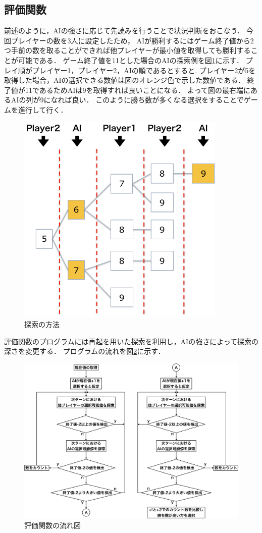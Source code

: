 \documentclass[a4paper,10pt]{jsarticle}
\begin{document}
\subsection{評価関数}
前述のように，AIの強さに応じて先読みを行うことで状況判断をおこなう．
今回プレイヤーの数を3人に設定したため，
AIが勝利するにはゲーム終了値から2つ手前の数を取ることができれば他プレイヤーが最小値を取得しても勝利することが可能である．
ゲーム終了値を11とした場合のAIの探索例を図\ref{fig:search}に示す．
プレイ順がプレイヤー1，プレイヤー2，AIの順であるとすると.
プレイヤー2が5を取得した場合，AIの選択できる数値は図のオレンジ色で示した数値である．
終了値が11であるためAIは9を取得すれば良いことになる．
よって図の最右端にあるAIの列が9になれば良い．
このように勝ち数が多くなる選択をすることでゲームを進行して行く．
\begin{figure}
  \centering
  \includegraphics[width=100mm]{./image/AI_Search.png}
  \caption{探索の方法}
  \label{fig:search}
\end{figure}
\par
評価関数のプログラムには再起を用いた探索を利用し，AIの強さによって探索の深さを変更する．
プログラムの流れを図\ref{fig:Flow}に示す．
\begin{figure}
  \centering
  \includegraphics[width=140mm]{./image/Search_Flow.png}
  \caption{評価関数の流れ図}
  \label{fig:Flow}
\end{figure}
\end{document}
